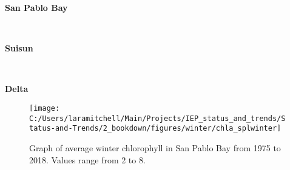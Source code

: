 \documentclass[
]{book}
\begin{document}
\begin{panel-grid}

\begin{columns-nocenter}

\begin{column800}

\textbf{San Pablo Bay}

\end{column800}

\begin{column40}

~

\end{column40}

\begin{column800}

\textbf{Suisun}

\end{column800}

\begin{column40}

~

\end{column40}

\begin{column800}

\textbf{Delta}

\end{column800}

\end{columns-nocenter}

\begin{columns-nocenter}

\begin{column800}

\begin{expand}

\begin{figure}
\texttt{[image: C:/Users/laramitchell/Main/Projects/IEP\_status\_and\_trends/Status-and-Trends/2\_bookdown/figures/winter/chla\_splwinter]} \caption{Graph of average winter chlorophyll in San Pablo Bay from 1975 to 2018. Values range from 2 to 8.}\label{fig:unnamed-chunk-158}
\end{figure}

\end{expand}

\end{column800}

\begin{column40}

~


\end{column40}
\end{columns-nocenter}
\end{panel-grid}
\end{document}

